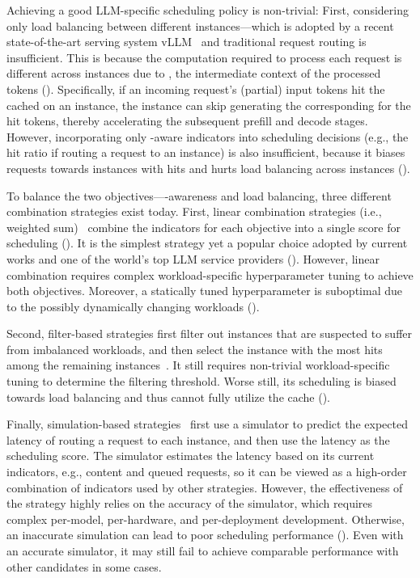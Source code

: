 Achieving a good LLM-specific scheduling policy is non-trivial:
First, considering only load balancing between different instances---which is adopted by 
a recent state-of-the-art serving system vLLM~\cite{vllm-code} and
traditional request routing
is insufficient.
This is because the computation required to process each request is different across 
instances due to {\kvcache},
the intermediate context of the processed tokens (\textsection{\ref{sec:kvcache-aware}}).
Specifically,
if an incoming request's (partial) input tokens hit the {\kvcache} cached on an instance,
the instance can skip generating the corresponding {\kvcache} for the hit tokens,
thereby accelerating the subsequent prefill and decode stages.
However,
incorporating only {\kvcache}-aware indicators into scheduling decisions 
(e.g., the {\kvcache} hit ratio if routing a request to an instance)
is also insufficient,
because it biases requests towards instances with {\kvcache} hits
and hurts load balancing across instances 
 (\textsection{\ref{sec:challenge-balancing}}).

To balance the two objectives---{\kvcache}-awareness and load balancing, 
three different combination strategies exist today. 
First, linear combination strategies (i.e., weighted sum)~\cite{vllm,ai-Dynamo} combine the indicators for each objective into a single score 
for scheduling (\textsection{\ref{sec:linear-combination}}). 
It is the simplest strategy yet a popular choice adopted by current works 
and one of the world's top LLM service providers ({\company}). 
However, linear combination requires complex workload-specific hyperparameter tuning to achieve both objectives.
Moreover, a statically tuned hyperparameter is suboptimal due to the possibly dynamically changing workloads (\textsection{\ref{sec:linear-combination}}).

Second, filter-based strategies first filter out instances that are suspected to suffer from imbalanced workloads,
and then select the instance with the most {\kvcache} hits among the remaining instances~\cite{aibrix}.
It still requires non-trivial workload-specific tuning to determine the filtering threshold.
Worse still, 
its scheduling is biased towards load balancing and 
thus cannot fully utilize the {\kvcache} cache (\textsection{\ref{sec:filter-combination}}).

Finally, simulation-based strategies~\cite{305212, llm-d, DBLP:journals/corr/abs-2507-17769, DBLP:journals/corr/abs-2504-08784}
first use a simulator to predict the expected latency of routing a request to each instance,
and then use the latency as the scheduling score.
The simulator estimates the latency based on its current indicators, e.g., {\kvcache} content and queued requests,
so it can be viewed as a high-order combination of indicators used by other strategies.
However, the effectiveness of the strategy highly relies on the accuracy of the simulator,
which requires complex per-model, per-hardware, and per-deployment development.
Otherwise,
an inaccurate simulation can lead to poor scheduling performance (\textsection{\ref{sec:prediction-combination}}).
Even with an accurate simulator, it may still fail to achieve comparable performance
with other candidates in some cases.

